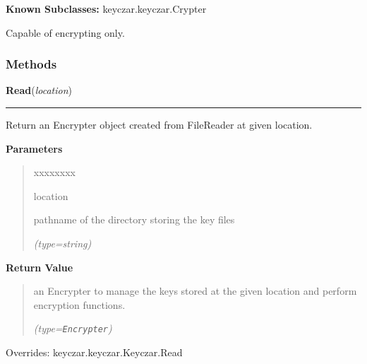 \textbf{Known Subclasses:} keyczar.keyczar.Crypter

Capable of encrypting only.



  \subsubsection{Methods}

    \vspace{0.5ex}

\hspace{.8\funcindent}\begin{boxedminipage}{\funcwidth}

    \raggedright \textbf{Read}(\textit{location})

    \vspace{-1.5ex}

    \rule{\textwidth}{0.5\fboxrule}
\setlength{\parskip}{2ex}
    Return an Encrypter object created from FileReader at given location.

\setlength{\parskip}{1ex}
      \textbf{Parameters}
      \vspace{-1ex}

      \begin{quote}
        \begin{Ventry}{xxxxxxxx}

          \item[location]

          pathname of the directory storing the key files

            {\it (type=string)}

        \end{Ventry}

      \end{quote}

      \textbf{Return Value}
    \vspace{-1ex}

      \begin{quote}
      an Encrypter to manage the keys stored at the given location and 
      perform encryption functions.

      {\it (type=\texttt{Encrypter})}

      \end{quote}

      Overrides: keyczar.keyczar.Keyczar.Read

    \end{boxedminipage}

